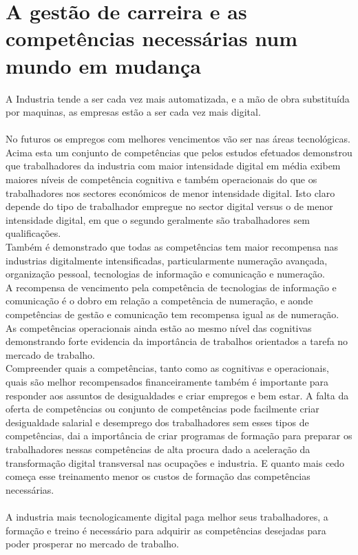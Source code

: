 \section{A gestão de carreira e as competências necessárias num mundo em mudança}
\qquad A Industria tende a ser cada vez mais automatizada, e a mão de obra substituída por maquinas, as empresas estão a ser cada vez mais digital.\\
\\
No futuros os empregos com melhores vencimentos vão ser nas áreas tecnológicas.\\

Acima esta um conjunto de competências que pelos estudos efetuados demonstrou que trabalhadores da industria com maior intensidade digital em média exibem maiores níveis de competência cognitiva e também operacionais do que os trabalhadores nos sectores económicos de menor intensidade digital. Isto claro depende do tipo de trabalhador empregue no sector digital versus o de menor intensidade digital, em que o segundo geralmente são trabalhadores sem qualificações. \cite{article_1}\\
Também é demonstrado que todas as competências tem maior recompensa nas industrias digitalmente intensificadas, particularmente numeração avançada, organização pessoal, tecnologias de informação e comunicação e numeração. \cite{article_1}\\
A recompensa de vencimento pela competência de tecnologias de informação e comunicação é o dobro em relação a competência de numeração, e aonde competências de gestão e comunicação tem recompensa igual as de numeração. \cite{article_1}\\
As competências operacionais ainda estão ao mesmo nível das cognitivas demonstrando forte evidencia da importância de trabalhos orientados a tarefa no mercado de trabalho. \cite{article_1}\\
Compreender quais a competências, tanto como as cognitivas e operacionais, quais são melhor recompensados financeiramente também é importante para responder aos assuntos de  desigualdades e criar empregos e bem estar. A falta da oferta de competências ou conjunto de competências pode facilmente criar desigualdade salarial e desemprego dos trabalhadores sem esses tipos de competências, dai a importância de criar programas de formação para preparar os trabalhadores nessas competências de alta procura dado a aceleração da transformação digital transversal nas ocupações e industria. E quanto mais cedo começa esse treinamento menor os custos de formação das competências necessárias. \cite{article_1}\\
\\
A industria mais tecnologicamente digital paga melhor seus trabalhadores, a formação e treino é necessário para adquirir as competências desejadas para poder prosperar no mercado de trabalho.

